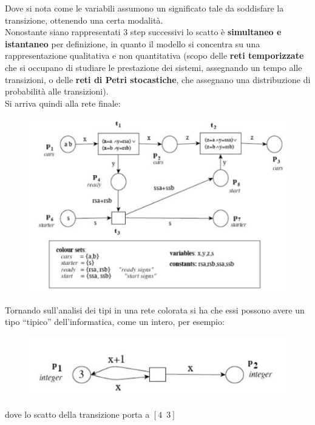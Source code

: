 \documentclass[a4paper,12pt, oneside]{book}
\begin{document}
\begin{esempio}
\begin{figure}[H]
  \end{figure}
  Dove si nota come le variabili assumono un significato tale da soddisfare la
  transizione, ottenendo una certa modalità.\\
  Nonostante siano rappresentati 3 step successivi lo scatto è
  \textbf{simultaneo e istantaneo} per definizione, in quanto il modello si
  concentra su una rappresentazione qualitativa e non quantitativa (scopo delle
  \textbf{reti temporizzate} che si occupano di studiare le prestazione dei
  sistemi, assegnando un tempo alle transizioni, o delle \textbf{reti di Petri
    stocastiche}, che assegnano una distribuzione di probabilità alle
  transizioni).\\
  Si arriva quindi alla rete finale:
  \begin{figure}[H]
    \centering
    \includegraphics[scale = 0.7]{img/c18.jpg}
  \end{figure}
\end{esempio}
\begin{esempio}
  Tornando sull'analisi dei tipi in una rete colorata si ha che essi possono
  avere un tipo ``tipico'' dell'informatica, come un intero, per esempio:
  \begin{figure}[H]
    \centering
    \includegraphics[scale = 0.7]{img/c17.jpg}
  \end{figure}
  dove lo scatto della transizione porta a $[4\,\,\,3]$
\end{esempio}
\end{document}
